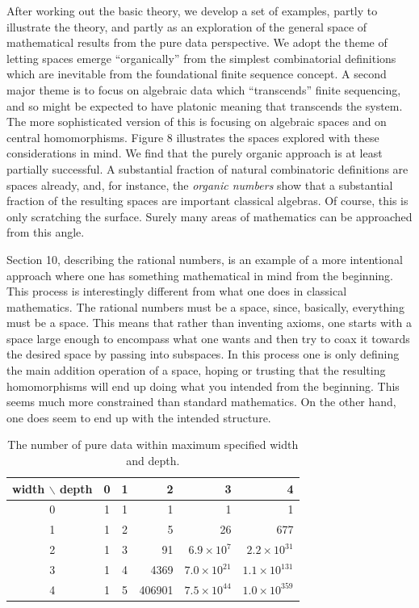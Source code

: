 \documentclass[11pt]{article}
\begin{document}
     After working out the basic theory, we develop a set of examples, partly to illustrate the theory, and partly as an exploration of the general 
space of mathematical results from the pure data perspective.  We adopt the theme of letting spaces emerge ``organically'' from the simplest 
combinatorial definitions which are inevitable from the foundational finite sequence concept.  A second major theme is to focus on algebraic 
data which ``transcends'' finite sequencing, and so might be expected to have platonic meaning that transcends the system.  The more 
sophisticated version of this is focusing on algebraic spaces and on central homomorphisms. 
Figure 8 illustrates the spaces explored with these considerations in mind.  
We find that the purely organic approach is at least partially successful.  A substantial fraction of natural combinatoric definitions are 
spaces already, and, for instance, the {\it organic numbers} show that a substantial fraction of the resulting spaces are important classical algebras.  Of course, this is only scratching the surface.  Surely many areas of mathematics can be approached from this angle.  

      Section 10, describing the rational numbers, is an example of a more intentional approach where one has something mathematical
in mind from the beginning.  This process is interestingly different from what one does in classical mathematics.  The rational numbers 
must be a space, since, basically, everything must be a space.  This means that rather than inventing axioms, one starts with a space 
large enough to encompass what one wants and then try to coax it towards the desired space by passing into subspaces.  In this 
process one is only defining the main addition operation of a space, hoping or trusting that the resulting homomorphisms will end up 
doing what you intended from the beginning.  This seems much more constrained than standard mathematics.  On the other hand, 
one does seem to end up with the intended structure.  
\begin{table}[h!]
\centering
\begin{tabular}{c|ccrrr}
\textbf{width} $\backslash$ \textbf{depth} & 0 & 1 & 2 & 3 & 4 \\
\hline
0 & 1 & 1 & 1 & 1 & 1 \\
1 & 1 & 2 & 5 & 26 & 677 \\
2 & 1 & 3 & 91 & $6.9\times 10^{7}$ & $2.2\times 10^{31}$ \\
3 & 1 & 4 & 4369 & $7.0\times 10^{21}$ & $1.1\times 10^{131}$ \\
4 & 1 & 5 & 406901 & $7.5\times 10^{44}$ & $1.0\times 10^{359}$ \\
\end{tabular}
\caption{The number of pure data within maximum specified width and depth.}
\label{tab:pure_data_counts}
\end{table}
\end{document}
